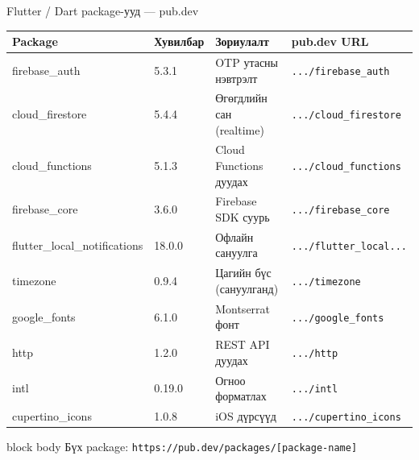 \documentclass[14pt,aspectratio=169]{beamer}
\begin{document}
\begin{frame}{Flutter / Dart package-ууд — pub.dev}
  \begin{center}
  \small
  \renewcommand{\arraystretch}{1.2}
  \begin{tabular}{llll}
    \toprule
    \rowcolor{navyblue}
    {\color{white}\textbf{Package}} &
    {\color{white}\textbf{Хувилбар}} &
    {\color{white}\textbf{Зориулалт}} &
    {\color{white}\textbf{pub.dev URL}} \\
    \midrule
    \rowcolor{rowgray}
    firebase\_auth         & 5.3.1  & OTP утасны нэвтрэлт   & \texttt{.../firebase\_auth} \\
    cloud\_firestore       & 5.4.4  & Өгөгдлийн сан (realtime) & \texttt{.../cloud\_firestore} \\
    \rowcolor{rowgray}
    cloud\_functions       & 5.1.3  & Cloud Functions дуудах & \texttt{.../cloud\_functions} \\
    firebase\_core         & 3.6.0  & Firebase SDK суурь    & \texttt{.../firebase\_core} \\
    \rowcolor{rowgray}
    flutter\_local\_notifications & 18.0.0 & Офлайн сануулга & \texttt{.../flutter\_local...} \\
    timezone               & 0.9.4  & Цагийн бүс (сануулганд) & \texttt{.../timezone} \\
    \rowcolor{rowgray}
    google\_fonts          & 6.1.0  & Montserrat фонт       & \texttt{.../google\_fonts} \\
    http                   & 1.2.0  & REST API дуудах       & \texttt{.../http} \\
    \rowcolor{rowgray}
    intl                   & 0.19.0 & Огноо форматлах       & \texttt{.../intl} \\
    cupertino\_icons       & 1.0.8  & iOS дүрсүүд           & \texttt{.../cupertino\_icons} \\
    \bottomrule
  \end{tabular}
  \end{center}
  \vspace{2pt}
  \begin{beamercolorbox}[sep=3pt,center,rounded=true]{block body}
    \small Бүх package: \texttt{https://pub.dev/packages/[package-name]}
  \end{beamercolorbox}
\end{frame}

\end{document}
